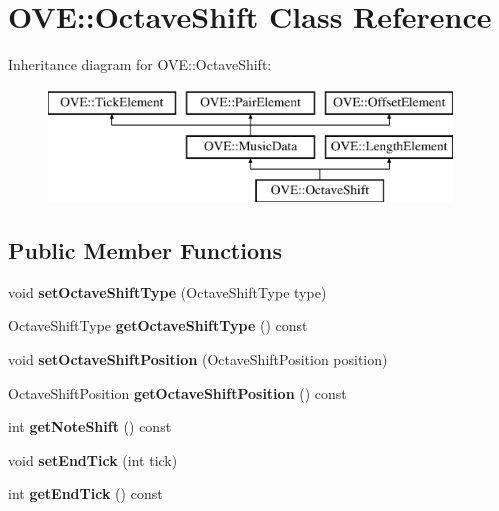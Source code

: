 \hypertarget{class_o_v_e_1_1_octave_shift}{}\section{O\+VE\+:\+:Octave\+Shift Class Reference}
\label{class_o_v_e_1_1_octave_shift}
Inheritance diagram for O\+VE\+:\+:Octave\+Shift\+:\begin{figure}[H]
\begin{center}
\leavevmode
\includegraphics[height=3.000000cm]{class_o_v_e_1_1_octave_shift}
\end{center}
\end{figure}
\subsection*{Public Member Functions}
\begin{DoxyCompactItemize}
\item 
\mbox{\label{class_o_v_e_1_1_octave_shift_a756c0d57f842dfbe6dd1d453e0e93bde}} 
void {\bfseries set\+Octave\+Shift\+Type} (Octave\+Shift\+Type type)
\item 
\mbox{\label{class_o_v_e_1_1_octave_shift_a9d570828d163a9fa66751cf008918933}} 
Octave\+Shift\+Type {\bfseries get\+Octave\+Shift\+Type} () const
\item 
\mbox{\label{class_o_v_e_1_1_octave_shift_a51717f41418b5e0d44d94614a4e25c86}} 
void {\bfseries set\+Octave\+Shift\+Position} (Octave\+Shift\+Position position)
\item 
\mbox{\label{class_o_v_e_1_1_octave_shift_a7cfc8f9341c3ae16f3f4142c2f54d459}} 
Octave\+Shift\+Position {\bfseries get\+Octave\+Shift\+Position} () const
\item 
\mbox{\label{class_o_v_e_1_1_octave_shift_a7e6dc654ec2adaed50ef8d8b3af808f6}} 
int {\bfseries get\+Note\+Shift} () const
\item 
\mbox{\label{class_o_v_e_1_1_octave_shift_ac36c0685fd990a80c15b9df5904e3f2f}} 
void {\bfseries set\+End\+Tick} (int tick)
\item 
\mbox{\label{class_o_v_e_1_1_octave_shift_a0bfae49365063b97fc0c9b11446f668c}} 
int {\bfseries get\+End\+Tick} () const
\end{DoxyCompactItemize}
